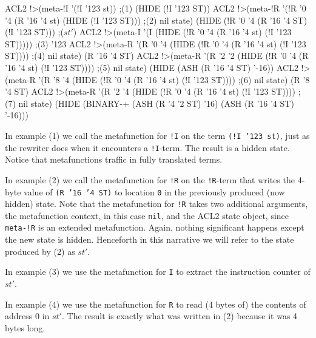 \documentclass[submission,copyright,creativecommons]{eptcs}
\newcommand{\ptt}[1]{\tt{#1}}
\begin{document}
\begin{acl2p}
ACL2 !>(meta-!I '(!I '123 st))                                         ;{\rm{(1)}}
(HIDE (!I '123 ST))
\vspace*{0.0em}
ACL2 !>(meta-!R '(!R '0 '4 (R '16 '4 st) (HIDE (!I '123 ST)))          ;{\rm{(2)}}
                nil state)
(HIDE (!R '0 '4 (R '16 '4 ST) (!I '123 ST)))                           ;{\rm{($st'$)}}
\vspace*{0.0em}
ACL2 !>(meta-I '(I (HIDE (!R '0 '4 (R '16 '4 st)  (!I '123 ST)))))     ;{\rm{(3)}}
'123
\vspace*{0.0em}
ACL2 !>(meta-R '(R '0 '4 (HIDE (!R '0 '4 (R '16 '4 st) (!I '123 ST)))) ;{\rm{(4)}}
               nil state)
(R '16 '4 ST)
\vspace*{0.0em}
ACL2 !>(meta-R '(R '2 '2 (HIDE (!R '0 '4 (R '16 '4 st) (!I '123 ST)))) ;{\rm{(5)}}
               nil state)
(HIDE (ASH (R '16 '4 ST) '-16))
\vspace*{0.0em}
ACL2 !>(meta-R '(R '8 '4 (HIDE (!R '0 '4 (R '16 '4 st) (!I '123 ST)))) ;{\rm{(6)}}
               nil state)
(R '8 '4 ST)
\vspace*{0.0em}
ACL2 !>(meta-R '(R '2 '4 (HIDE (!R '0 '4 (R '16 '4 st) (!I '123 ST)))) ;{\rm{(7)}}
               nil state)
(HIDE (BINARY-+ (ASH (R '4 '2 ST) '16)
                (ASH (R '16 '4 ST) '-16)))
\end{acl2p}

In example {\rm{(1)}} we call the metafunction for {\ptt{!I}} on the term {\ptt{(!I '123 st)}},
just as the rewriter does when it encounters a {\ptt{!I}}-term.  The result is
a hidden state.  Notice that metafunctions traffic in fully translated terms.

In example {\rm{(2)}} we call the metafunction for {\ptt{!R}} on the {\ptt{!R}}-term
that writes the 4-byte value of {\ptt{(R '16 '4 ST)}} to location {\ptt{0}} in
the previously produced (now hidden) state.  Note that the metafunction for {\ptt{!R}}
takes two additional arguments, the metafunction context, in this case {\ptt{nil}}, and the ACL2 state object,
since {\ptt{meta-!R}} is an extended metafunction.  Again, nothing significant happens
except the new state is hidden.   Henceforth in this narrative we will refer to the
state produced by {\rm{(2)}} as $st'$.

In example {\rm{(3)}} we use the metafunction for {\ptt{I}} to extract the instruction counter
of $st'$.

In example {\rm{(4)}} we use the metafunction for {\ptt{R}} to read (4 bytes of) the
contents of address 0 in $st'$.  The result is exactly what was written in {\rm{(2)}}
because it was 4 bytes long.
\end{document}
